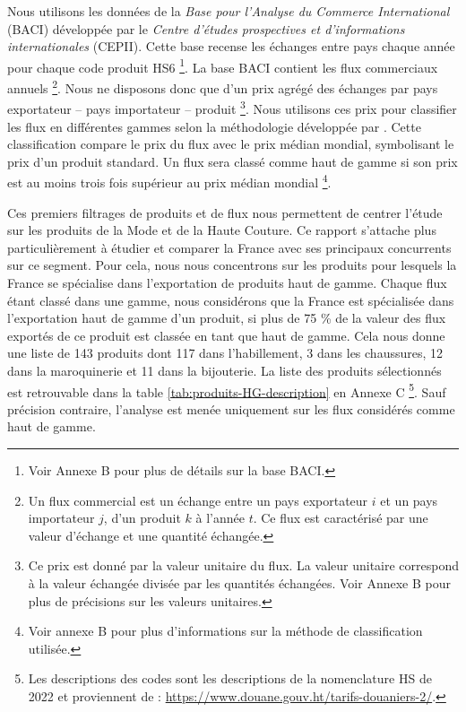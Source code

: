 \documentclass[french,10pt,a4paper]{article}
\begin{document}
Nous utilisons les données de la \textit{Base pour l'Analyse du Commerce International} (BACI) \citep{Gaulier2010} développée par le \textit{Centre d'études prospectives et d'informations internationales} (CEPII). Cette base recense les échanges entre pays chaque année pour chaque code produit HS6 \footnote{Voir Annexe B pour plus de détails sur la base BACI.}. La base BACI contient les flux commerciaux annuels \footnote{Un flux commercial est un échange entre un pays exportateur $i$ et un pays importateur $j$, d'un produit $k$ à l'année $t$. Ce flux est caractérisé par une valeur d'échange et une quantité échangée.}. Nous ne disposons donc que d'un \og prix\fg{} agrégé des échanges par pays exportateur – pays importateur – produit \footnote{Ce \og prix\fg{} est donné par la valeur unitaire du flux. La valeur unitaire correspond à la valeur échangée divisée par les quantités échangées. Voir Annexe B pour plus de précisions sur les valeurs unitaires.}. Nous utilisons ces prix pour classifier les flux en différentes gammes selon la méthodologie développée par \cite{Fontagne1997}. Cette classification compare le prix du flux avec le prix médian mondial, symbolisant le prix d'un produit standard. Un flux sera classé comme haut de gamme si son prix est au moins trois fois supérieur au prix médian mondial \footnote{Voir annexe B pour plus d'informations sur la méthode de classification utilisée.}.

\bigskip

Ces premiers filtrages de produits et de flux nous permettent de centrer l'étude sur les produits de la Mode et de la Haute Couture. Ce rapport s'attache plus particulièrement à étudier et comparer la France avec ses principaux concurrents sur ce segment. Pour cela, nous nous concentrons sur les produits pour lesquels la France se spécialise dans l'exportation de produits haut de gamme. Chaque flux étant classé dans une gamme, nous considérons que la France est spécialisée dans l'exportation haut de gamme d'un produit, si plus de 75 \% de la valeur des flux exportés de ce produit est classée en tant que haut de gamme. Cela nous donne une liste de 143 produits dont 117 dans l'habillement, 3 dans les chaussures, 12 dans la maroquinerie et 11 dans la bijouterie. La liste des produits sélectionnés est retrouvable dans la table \ref{tab:produits-HG-description} en Annexe C \footnote{Les descriptions des codes sont les descriptions de la nomenclature HS de 2022 et proviennent de : \href{https://www.douane.gouv.ht/tarifs-douaniers-2/}{https://www.douane.gouv.ht/tarifs-douaniers-2/}.}. Sauf précision contraire, l'analyse est menée uniquement sur les flux considérés comme haut de gamme.
\end{document}
